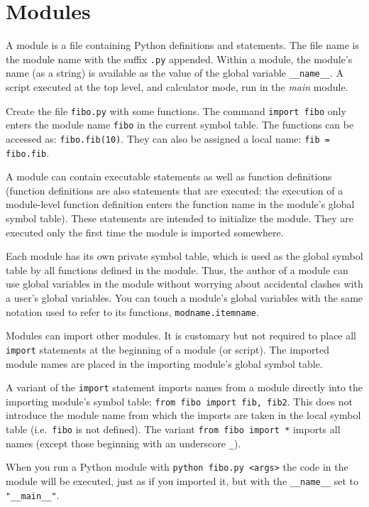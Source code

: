 \section{Modules}

A module is a file containing Python definitions and statements.
The file name is the module name with the suffix \verb=.py= appended.
Within a module, the module's name (as a string)
is available as the value of the global variable \verb=__name__=.
A script executed at the top level, and calculator mode,
run in the \emph{main} module.

Create the file \verb=fibo.py= with some functions.
The command \verb=import fibo= only enters the module name \verb=fibo=
in the current symbol table.
The functions can be accessed as: \verb=fibo.fib(10)=.
They can also be assigned a local name: \verb|fib = fibo.fib|.

A module can contain executable statements as well as function definitions
(function definitions are also statements that are executed:
the execution of a module-level function definition
enters the function name in the module's global symbol table).
These statements are intended to initialize the module.
They are executed only the first time the module is imported somewhere.

Each module has its own private symbol table,
which is used as the global symbol table
by all functions defined in the module.
Thus, the author of a module can use global variables in the module
without worrying about accidental clashes with a user's global variables.
You can touch a module's global variables
with the same notation used to refer to its functions, \verb=modname.itemname=.

Modules can import other modules.
It is customary but not required to place all \verb=import= statements
at the beginning of a module (or script).
The imported module names are placed
in the importing module's global symbol table.

A variant of the \verb=import= statement imports names from a module
directly into the importing module's symbol table:
\verb=from fibo import fib, fib2=.
This does not introduce the module name from which the imports are taken
in the local symbol table (i.e.\ \verb=fibo= is not defined).
The variant \verb=from fibo import *= imports all names
(except those beginning with an underscore \verb=_=).

When you run a Python module with \verb=python fibo.py <args>=
the code in the module will be executed, just as if you imported it,
but with the \verb=__name__= set to \verb="__main__"=.

